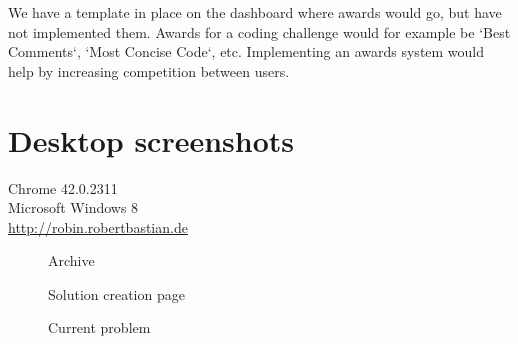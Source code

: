 \documentclass{report}
\begin{document}
We have a template in place on the dashboard where awards would go, but have not implemented them. Awards for a coding challenge would for example be `Best Comments`, `Most Concise Code`, etc. Implementing an awards system would help by increasing competition between users.

\appendix

\chapter{Desktop screenshots}
Chrome 42.0.2311\\Microsoft Windows 8\\\url{http://robin.robertbastian.de}

\begin{figure}
\caption{Archive}
\end{figure}

\begin{figure}
\caption{Solution creation page}
\end{figure}

\begin{figure}
\caption{Current problem}
\end{figure}
\end{document}
